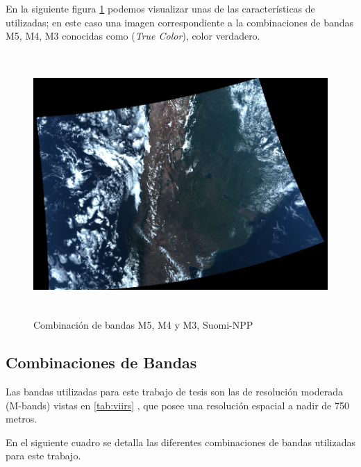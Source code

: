En la siguiente figura \ref{Fig: bandas543} podemos visualizar unas de las características de utilizadas; en este caso una imagen correspondiente a la combinaciones de bandas M5, M4, M3 conocidas como (\textit{True Color}), color verdadero.

\begin{figure}[H]
 \centering
  \includegraphics[height=10cm,keepaspectratio=true,clip=true]{imagenes/RecolecciondeDatos/img-543.png}
  \caption{Combinación de bandas M5, M4 y M3, Suomi-NPP}
	\label{Fig: bandas543}
\end{figure}


\subsection{Combinaciones de Bandas}\label{sub:comb_de_banda}

Las bandas  utilizadas para este trabajo de tesis  son las  de resolución moderada (M-bands) vistas en \ref{tab:viirs} , que posee una resolución espacial a nadir de 750 metros.

En el siguiente cuadro se detalla las diferentes combinaciones de bandas utilizadas para este trabajo.


